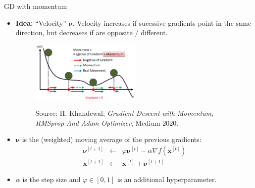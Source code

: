 \documentclass[11pt,compress,t,notes=noshow, xcolor=table]{beamer}
\begin{document}
\begin{vbframe}{GD with momentum}

\begin{itemize}
\item \textbf{Idea: } \enquote{Velocity} $\bm{\nu}$. Velocity increases if sucessive gradients point in the same direction, but decreases if are opposite / different. 

\begin{figure}
	\includegraphics[width = 0.5\textwidth]{figure_man/momentum_illustration_medium.png} \\
	\begin{footnotesize}
	Source: H. Khandewal, \emph{Gradient Descent with Momentum, RMSprop And Adam Optimizer}, Medium 2020. 
	\end{footnotesize}
\end{figure}

\item $\bm{\nu}$ is the (weighted) moving average of the previous gradients:
\begin{eqnarray*}
        \bm{\nu}^{[t+1]} &\leftarrow& \varphi \bm{\nu}^{[t]} - \alpha \nabla f(\bm{x}^{[t]}) \\
        \bm{x}^{[t + 1]} &\leftarrow&  \bm{x}^{[t]} + \bm{\nu}^{[t+1]}
\end{eqnarray*}
\item $\alpha$ is the step size and $\varphi \in [0,1]$ is an additional hyperparameter. 
\end{itemize}

\framebreak



\end{vbframe}
\end{document}
